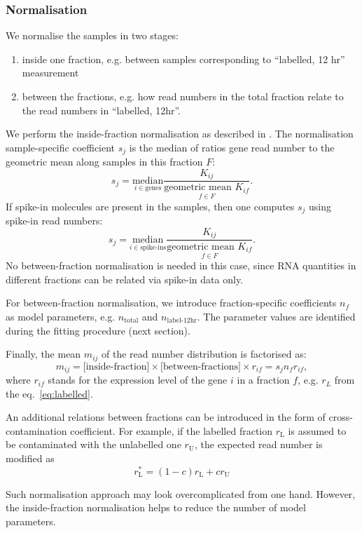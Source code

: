 \subsubsection{Normalisation}
\label{subsec:normalisation}		
We normalise the samples in two stages:
\begin{enumerate}
\item inside one fraction,
e.g. between samples corresponding to ``labelled, 12 hr'' measurement
\item between the fractions, 
e.g. how read numbers in the total fraction relate to the read numbers in 
``labelled, 12hr''.
\end{enumerate}
We perform the inside-fraction  normalisation as described in 
\citep{anders2010differential}. The normalisation sample-specific 
coefficient $s_j$ is the median of ratios gene read number to the geometric mean
along samples in this fraction $F$:
\begin{equation}
 s_j = \underset{i\in \text{genes}}{\mathrm{median}}
 \frac{K_{ij}}{\underset{f \in F}{\text{geometric mean }K_{if}}}.
\end{equation}
If spike-in molecules are present in the samples, then one computes $s_{j}$ 
using spike-in read numbers: 
\begin{equation}
 s_j = \underset{i \in \text{spike-ins}}{\mathrm{median}}
 \frac{K_{ij}}{\underset{f \in F}{\text{geometric mean }K_{if}}}.
\end{equation}
No between-fraction normalisation is needed in this case, since RNA quantities
in different fractions can be related via spike-in data only.
\par
For between-fraction normalisation, we introduce fraction-specific 
coefficients $n_f$ as model parameters, 
e.g. $n_\text{total}$ and $n_\text{label-12hr}$. The parameter values are identified
during the fitting procedure (next section).
\par
Finally, the mean $m_{ij}$ of the read number distribution is factorised as:
\begin{equation}
 m_{ij} = \text{[inside-fraction]}\times\text{[between-fractions]}\times
 r_{if} = s_jn_fr_{if},
 \end{equation}
where $r_{if}$ stands for the expression level of the gene $i$ in a fraction $f$, e.g.
$r_L$ from the eq.~\ref{eq:labelled}. 
\par
An additional relations between fractions can be introduced in the form 
of cross-contamination coefficient. For example,
if the labelled fraction $r_\text{L}$ is assumed to be 
contaminated with the unlabelled one $r_\text{U}$,
the expected read number is modified as
\begin{equation}
  r^*_\text{L} = (1-c)r_\text{L} + cr_\text{U}
 \end{equation}
\par  Such normalisation approach may look overcomplicated 
from one hand. However, the inside-fraction normalisation helps to reduce the number
of model parameters. 
